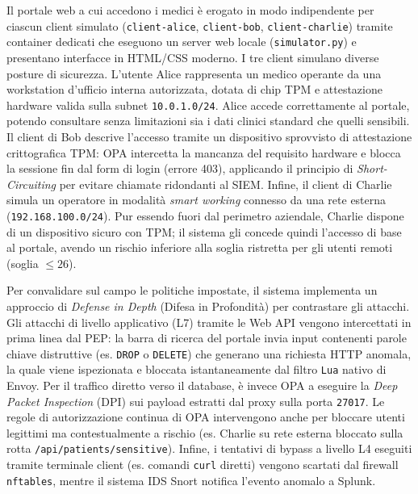 Il portale web a cui accedono i medici è erogato in modo indipendente per ciascun client simulato (\texttt{client-alice}, \texttt{client-bob}, \texttt{client-charlie}) tramite container dedicati che eseguono un server web locale (\texttt{simulator.py}) e presentano interfacce in HTML/CSS moderno. I tre client simulano diverse posture di sicurezza. L'utente Alice rappresenta un medico operante da una workstation d'ufficio interna autorizzata, dotata di chip TPM e attestazione hardware valida sulla subnet \texttt{10.0.1.0/24}. Alice accede correttamente al portale, potendo consultare senza limitazioni sia i dati clinici standard che quelli sensibili. Il client di Bob descrive l'accesso tramite un dispositivo sprovvisto di attestazione crittografica TPM: OPA intercetta la mancanza del requisito hardware e blocca la sessione fin dal form di login (errore 403), applicando il principio di \textit{Short-Circuiting} per evitare chiamate ridondanti al SIEM. Infine, il client di Charlie simula un operatore in modalità \textit{smart working} connesso da una rete esterna (\texttt{192.168.100.0/24}). Pur essendo fuori dal perimetro aziendale, Charlie dispone di un dispositivo sicuro con TPM; il sistema gli concede quindi l'accesso di base al portale, avendo un rischio inferiore alla soglia ristretta per gli utenti remoti (soglia \(\le 26\)). 

Per convalidare sul campo le politiche impostate, il sistema implementa un approccio di \textit{Defense in Depth} (Difesa in Profondità) per contrastare gli attacchi. Gli attacchi di livello applicativo (L7) tramite le Web API vengono intercettati in prima linea dal PEP: la barra di ricerca del portale invia input contenenti parole chiave distruttive (es. \texttt{DROP} o \texttt{DELETE}) che generano una richiesta HTTP anomala, la quale viene ispezionata e bloccata istantaneamente dal filtro \texttt{Lua} nativo di Envoy. Per il traffico diretto verso il database, è invece OPA a eseguire la \textit{Deep Packet Inspection} (DPI) sui payload estratti dal proxy sulla porta \texttt{27017}. Le regole di autorizzazione continua di OPA intervengono anche per bloccare utenti legittimi ma contestualmente a rischio (es. Charlie su rete esterna bloccato sulla rotta \texttt{/api/patients/sensitive}). Infine, i tentativi di bypass a livello L4 eseguiti tramite terminale client (es. comandi \texttt{curl} diretti) vengono scartati dal firewall \texttt{nftables}, mentre il sistema IDS Snort notifica l'evento anomalo a Splunk.